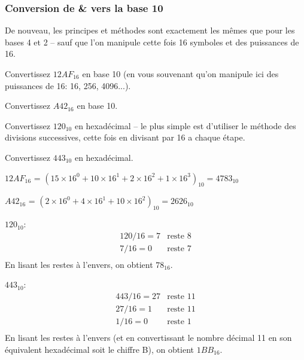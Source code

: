 \documentclass[12pt]{article}
\begin{document}
	 \subsubsection*{Conversion de \& vers la base 10}
	 De nouveau, les principes et méthodes sont exactement les mêmes que pour les bases 4 et 2 -- sauf que l'on manipule cette fois 16 symboles et des puissances de 16.
	 
	 \begin{MonExo}
	 	\begin{alphenum}
	 		\item Convertissez $12AF_{16}$ en base 10 (en vous souvenant qu'on manipule ici des puissances de 16: 16, 256, 4096...).
	 		\item Convertissez $A42_{16}$ en base 10.
	 		\item Convertissez $120_{10}$ en hexadécimal -- le plus simple est d'utiliser le méthode des divisions successives, cette fois en divisant par 16 a chaque étape.
	 		\item Convertissez $443_{10}$ en hexadécimal.
	 	\end{alphenum}
	 \end{MonExo}
	 \begin{MaReponse}
	 	\begin{alphenum}
	 		\item $12AF_{16}$ = $(15 \times 16^0 + 10 \times 16^1 + 2 \times 16^2 + 1 \times 16^3)_{10} = 4783_{10}$ %
	 		\item $A42_{16}$ = $(2 \times 16^0 + 4 \times 16^1 + 10 \times 16^2)_{10} = 2626_{10}$
	 		\item $120_{10}$:
	 		\[
	 		\begin{array}{ll}
	 			120/ 16 = 7 & \text{reste } 8 \\
	 			7 / 16 = 0 & \text{reste } 7 \\
	 		\end{array}
	 		\]
	 		En lisant les restes à l'envers, on obtient $78_{16}$.
	 		\item $443_{10}$:
	 		\[
	 		\begin{array}{ll}
	 			443/ 16 = 27 & \text{reste } 11 \\
	 			27 / 16 = 1 & \text{reste } 11 \\
	 			1 / 16 = 0 & \text{reste } 1 \\
	 		\end{array}
	 		\]
	 		En lisant les restes à l'envers (et en convertissant le nombre décimal 11 en son équivalent hexadécimal soit le chiffre B), on obtient $1BB_{16}$.
	 	\end{alphenum}
	 \end{MaReponse}
	 
\end{document}
